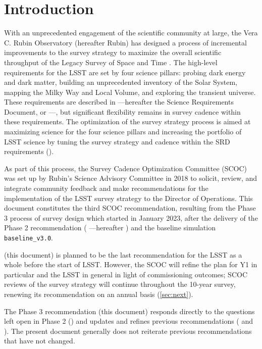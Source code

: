 \section{Introduction}

With an unprecedented engagement of the scientific community at large, the Vera C. Rubin Observatory (hereafter Rubin) has designed a process of incremental improvements to the survey strategy to maximize the overall scientific throughput of the Legacy Survey of Space and Time \citep[LSST;][]{2019ApJ...873..111I}. The high-level requirements for the LSST are set by four science pillars: probing dark energy and dark matter, building an unprecedented inventory of the Solar System, mapping the Milky Way and Local Volume, and exploring the transient universe.
These requirements are described in \cite{LPM-17} ---hereafter the Science Requirements Document, or ---, but significant flexibility remains in survey cadence within these requirements. The optimization of the survey strategy process is aimed at maximizing science for the four science pillars and increasing the portfolio of LSST science by tuning the survey strategy and cadence within the SRD requirements ().

As part of this process, the Survey Cadence Optimization Committee (SCOC) was set up by Rubin's Science Advisory Committee in 2018 to solicit, review, and integrate community feedback and make recommendations for the implementation of the LSST survey strategy to the Director of Operations. This document constitutes the third SCOC recommendation, resulting from the Phase 3 process of survey design which started in January 2023, after the delivery of the Phase 2 recommendation  (\citealt{PSTN-055} ---hereafter ) and the baseline simulation \texttt{baseline\_v3.0}.

\cite{PSTN-056} (this document) is planned to be the last recommendation for the LSST as a whole before the start of LSST. However, the SCOC will refine the plan for Y1 in particular and the LSST in general in light of commissioning outcomes; SCOC reviews of the survey strategy will continue throughout the 10-year survey,  renewing its recommendation on an annual basis (\autoref{sec:next}).

The Phase 3 recommendation (this document) responds directly to the questions left open in Phase 2 () and updates and refines previous recommendations ( and  ). The present document generally does not reiterate previous recommendations that have not changed.




